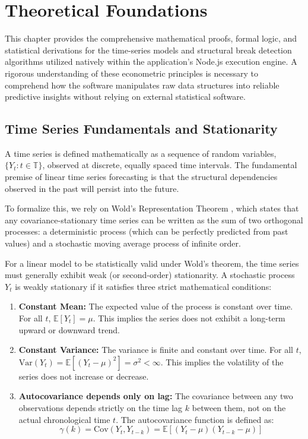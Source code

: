 \chapter{Theoretical Foundations}
\label{ch:theoretical_foundations}

This chapter provides the comprehensive mathematical proofs, formal logic, and statistical derivations for the time-series models and structural break detection algorithms utilized natively within the application's Node.js execution engine. A rigorous understanding of these econometric principles is necessary to comprehend how the software manipulates raw data structures into reliable predictive insights without relying on external statistical software.

\section{Time Series Fundamentals and Stationarity}
A time series is defined mathematically as a sequence of random variables, $\{Y_t : t \in \mathbb{T}\}$, observed at discrete, equally spaced time intervals. The fundamental premise of linear time series forecasting is that the structural dependencies observed in the past will persist into the future. 

To formalize this, we rely on Wold's Representation Theorem \cite{Wold1938}, which states that any covariance-stationary time series can be written as the sum of two orthogonal processes: a deterministic process (which can be perfectly predicted from past values) and a stochastic moving average process of infinite order.

For a linear model to be statistically valid under Wold's theorem, the time series must generally exhibit weak (or second-order) stationarity. A stochastic process $Y_t$ is weakly stationary if it satisfies three strict mathematical conditions:
\begin{enumerate}
    \item \textbf{Constant Mean:} The expected value of the process is constant over time. For all $t$, $\mathbb{E}[Y_t] = \mu$. This implies the series does not exhibit a long-term upward or downward trend.
    \item \textbf{Constant Variance:} The variance is finite and constant over time. For all $t$, $\text{Var}(Y_t) = \mathbb{E}[(Y_t - \mu)^2] = \sigma^2 < \infty$. This implies the volatility of the series does not increase or decrease.
    \item \textbf{Autocovariance depends only on lag:} The covariance between any two observations depends strictly on the time lag $k$ between them, not on the actual chronological time $t$. The autocovariance function is defined as:
    \begin{equation}
        \gamma(k) = \text{Cov}(Y_t, Y_{t-k}) = \mathbb{E}[(Y_t - \mu)(Y_{t-k} - \mu)]
    \end{equation}
\end{enumerate}

